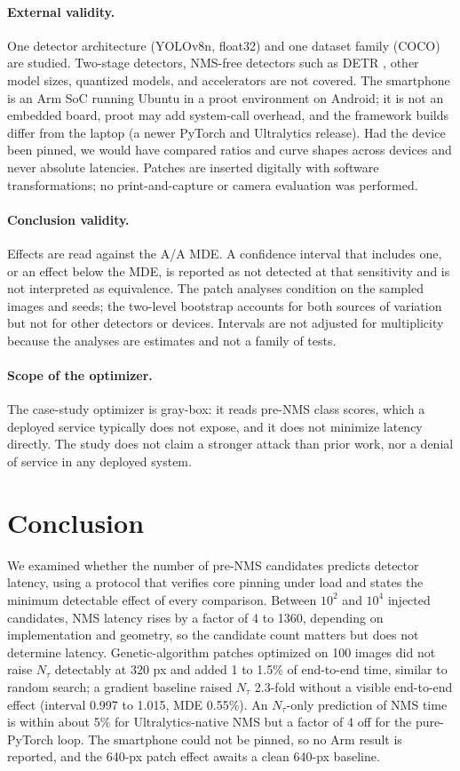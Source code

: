 \documentclass[a4paper,fleqn]{cas-dc}
\newcommand{\Ntau}{N_{\tau}}
\begin{document}
\paragraph{External validity.}
One detector architecture (YOLOv8n, float32) and one dataset family (COCO) are studied. Two-stage detectors, NMS-free detectors such as DETR \cite{carion2020detr}, other model sizes, quantized models, and accelerators are not covered. The smartphone is an Arm SoC running Ubuntu in a proot environment on Android; it is not an embedded board, proot may add system-call overhead, and the framework builds differ from the laptop (a newer PyTorch and Ultralytics release). Had the device been pinned, we would have compared ratios and curve shapes across devices and never absolute latencies. Patches are inserted digitally with software transformations; no print-and-capture or camera evaluation was performed.
\paragraph{Conclusion validity.}
Effects are read against the A/A MDE. A confidence interval that includes one, or an effect below the MDE, is reported as not detected at that sensitivity and is not interpreted as equivalence. The patch analyses condition on the sampled images and seeds; the two-level bootstrap accounts for both sources of variation but not for other detectors or devices. Intervals are not adjusted for multiplicity because the analyses are estimates and not a family of tests.
\paragraph{Scope of the optimizer.}
The case-study optimizer is gray-box: it reads pre-NMS class scores, which a deployed service typically does not expose, and it does not minimize latency directly. The study does not claim a stronger attack than prior work, nor a denial of service in any deployed system.

\section{Conclusion}
We examined whether the number of pre-NMS candidates predicts detector latency, using a protocol that verifies core pinning under load and states the minimum detectable effect of every comparison. Between $10^2$ and $10^4$ injected candidates, NMS latency rises by a factor of 4 to 1360, depending on implementation and geometry, so the candidate count matters but does not determine latency. Genetic-algorithm patches optimized on 100 images did not raise $\Ntau$ detectably at 320 px and added 1 to 1.5\% of end-to-end time, similar to random search; a gradient baseline raised $\Ntau$ 2.3-fold without a visible end-to-end effect (interval 0.997 to 1.015, MDE 0.55\%). An $\Ntau$-only prediction of NMS time is within about 5\% for Ultralytics-native NMS but a factor of 4 off for the pure-PyTorch loop. The smartphone could not be pinned, so no Arm result is reported, and the 640-px patch effect awaits a clean 640-px baseline.
\end{document}
